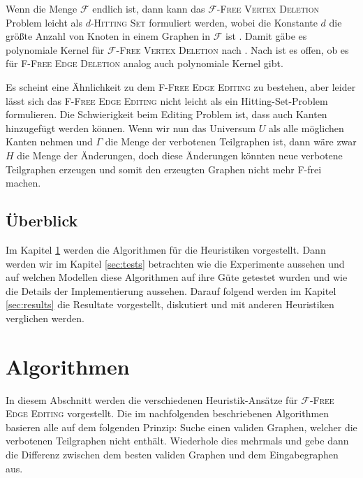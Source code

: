 \documentclass[12pt,a4paper,onecolumn,oneside,titlepage]{article}
\newcommand\cursive[1]{\ensuremath{\mathcal{#1}}}
\begin{document}
Wenn die Menge \cursive{F} endlich ist, dann kann das \textsc{\cursive{F}-Free Vertex Deletion} Problem leicht als \textsc{$d$-Hitting Set} formuliert werden, wobei die Konstante $d$ die größte Anzahl von Knoten in einem Graphen in \cursive{F} ist \cite{Kratsch13}. Damit gäbe es polynomiale Kernel für \textsc{\cursive{F}-Free Vertex Deletion} nach \cite{Abu10}.
Nach \cite{Bodlaender06} ist es offen, ob es für \textsc{F-Free Edge Deletion} analog auch polynomiale Kernel gibt.

Es scheint eine Ähnlichkeit zu dem \textsc{F-Free Edge Editing} zu bestehen, aber leider lässt sich das \textsc{F-Free Edge Editing} nicht leicht als ein Hitting-Set-Problem formulieren. Die Schwierigkeit beim Editing Problem ist, dass auch Kanten hinzugefügt werden können. Wenn wir nun das Universum $U$ als alle möglichen Kanten nehmen und $\Gamma$ die Menge der verbotenen Teilgraphen ist, dann wäre zwar $H$ die Menge der Änderungen, doch diese Änderungen könnten neue verbotene Teilgraphen erzeugen und somit den erzeugten Graphen nicht mehr F-frei machen.



\subsection{Überblick}
Im Kapitel \ref{sec:algos} werden die Algorithmen für die Heuristiken vorgestellt. Dann werden wir im Kapitel \ref{sec:tests} betrachten wie die Experimente aussehen und auf welchen Modellen diese Algorithmen auf ihre Güte getestet wurden und wie die Details der Implementierung aussehen.
Darauf folgend werden im Kapitel \ref{sec:results} die Resultate vorgestellt,  diskutiert und mit anderen Heuristiken verglichen werden.
\newpage 
\section{Algorithmen}

\label{sec:algos}

In diesem Abschnitt werden die verschiedenen Heuristik-Ansätze für \textsc{\cursive{F}-Free Edge Editing} vorgestellt. 
Die im nachfolgenden beschriebenen Algorithmen basieren alle auf dem folgenden Prinzip: Suche einen validen Graphen, welcher die verbotenen Teilgraphen nicht enthält. Wiederhole dies mehrmals und gebe dann die Differenz zwischen dem besten validen Graphen und dem Eingabegraphen aus.
\end{document}

